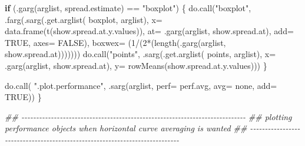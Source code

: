 \documentclass[
  letterpaper,
  DIV=11,
  numbers=noendperiod]{scrartcl}
\newenvironment{Shaded}{\begin{snugshade}}{\end{snugshade}}
\newcommand{\AttributeTok}[1]{\textcolor[rgb]{0.40,0.45,0.13}{#1}}
\newcommand{\ConstantTok}[1]{\textcolor[rgb]{0.56,0.35,0.01}{#1}}
\newcommand{\ControlFlowTok}[1]{\textcolor[rgb]{0.00,0.23,0.31}{\textbf{#1}}}
\newcommand{\DecValTok}[1]{\textcolor[rgb]{0.68,0.00,0.00}{#1}}
\newcommand{\DocumentationTok}[1]{\textcolor[rgb]{0.37,0.37,0.37}{\textit{#1}}}
\newcommand{\FunctionTok}[1]{\textcolor[rgb]{0.28,0.35,0.67}{#1}}
\newcommand{\NormalTok}[1]{\textcolor[rgb]{0.00,0.23,0.31}{#1}}
\newcommand{\SpecialCharTok}[1]{\textcolor[rgb]{0.37,0.37,0.37}{#1}}
\newcommand{\StringTok}[1]{\textcolor[rgb]{0.13,0.47,0.30}{#1}}
\begin{document}
\begin{Shaded}
\begin{Highlighting}[]
    \ControlFlowTok{if}\NormalTok{ (}\FunctionTok{.garg}\NormalTok{(arglist, }\StringTok{\textquotesingle{}spread.estimate\textquotesingle{}}\NormalTok{) }\SpecialCharTok{==} \StringTok{"boxplot"}\NormalTok{) \{}
        \FunctionTok{do.call}\NormalTok{(}\StringTok{"boxplot"}\NormalTok{,}
                \FunctionTok{.farg}\NormalTok{(}\FunctionTok{.sarg}\NormalTok{(}\FunctionTok{.get.arglist}\NormalTok{( }\StringTok{\textquotesingle{}boxplot\textquotesingle{}}\NormalTok{, arglist),}
                            \AttributeTok{x=} \FunctionTok{data.frame}\NormalTok{(}\FunctionTok{t}\NormalTok{(show.spread.at.y.values)),}
                            \AttributeTok{at=} \FunctionTok{.garg}\NormalTok{(arglist, }\StringTok{\textquotesingle{}show.spread.at\textquotesingle{}}\NormalTok{),}
                            \AttributeTok{add=} \ConstantTok{TRUE}\NormalTok{,}
                            \AttributeTok{axes=} \ConstantTok{FALSE}\NormalTok{),}
                      \AttributeTok{boxwex=}\NormalTok{ (}\DecValTok{1}\SpecialCharTok{/}\NormalTok{(}\DecValTok{2}\SpecialCharTok{*}\NormalTok{(}\FunctionTok{length}\NormalTok{(}\FunctionTok{.garg}\NormalTok{(arglist,}
                                                  \StringTok{\textquotesingle{}show.spread.at\textquotesingle{}}\NormalTok{)))))))}
        \FunctionTok{do.call}\NormalTok{(}\StringTok{"points"}\NormalTok{,}
                \FunctionTok{.sarg}\NormalTok{(}\FunctionTok{.get.arglist}\NormalTok{( }\StringTok{\textquotesingle{}points\textquotesingle{}}\NormalTok{, arglist),}
                      \AttributeTok{x=} \FunctionTok{.garg}\NormalTok{(arglist, }\StringTok{\textquotesingle{}show.spread.at\textquotesingle{}}\NormalTok{),}
                      \AttributeTok{y=} \FunctionTok{rowMeans}\NormalTok{(show.spread.at.y.values)))}
\NormalTok{    \}}
    
    \FunctionTok{do.call}\NormalTok{( }\StringTok{".plot.performance"}\NormalTok{, }\FunctionTok{.sarg}\NormalTok{(arglist,}
                                       \AttributeTok{perf=}\NormalTok{ perf.avg,}
                                       \AttributeTok{avg=} \StringTok{\textquotesingle{}none\textquotesingle{}}\NormalTok{,}
                                       \AttributeTok{add=} \ConstantTok{TRUE}\NormalTok{))}
\NormalTok{\}}

\DocumentationTok{\#\# {-}{-}{-}{-}{-}{-}{-}{-}{-}{-}{-}{-}{-}{-}{-}{-}{-}{-}{-}{-}{-}{-}{-}{-}{-}{-}{-}{-}{-}{-}{-}{-}{-}{-}{-}{-}{-}{-}{-}{-}{-}{-}{-}{-}{-}{-}{-}{-}{-}{-}{-}{-}{-}{-}{-}{-}{-}{-}{-}{-}{-}{-}{-}{-}{-}{-}{-}{-}{-}{-}{-}{-}{-}{-}{-}{-}}
\DocumentationTok{\#\# plotting performance objects when horizontal curve averaging is wanted}
\DocumentationTok{\#\# {-}{-}{-}{-}{-}{-}{-}{-}{-}{-}{-}{-}{-}{-}{-}{-}{-}{-}{-}{-}{-}{-}{-}{-}{-}{-}{-}{-}{-}{-}{-}{-}{-}{-}{-}{-}{-}{-}{-}{-}{-}{-}{-}{-}{-}{-}{-}{-}{-}{-}{-}{-}{-}{-}{-}{-}{-}{-}{-}{-}{-}{-}{-}{-}{-}{-}{-}{-}{-}{-}{-}{-}{-}{-}{-}{-}}


\end{Highlighting}
\end{Shaded}
\end{document}

